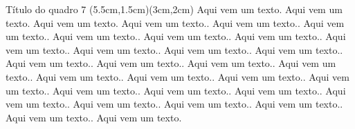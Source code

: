 \documentclass[aspectratio=169]{beamer}
\begin{document}
	\begin{frame}{Título do quadro 7}
		\hypersetup{linkbordercolor=blue}
		(5.5cm,1.5cm)(3cm,2cm)
		Aqui vem um texto. Aqui vem um texto. Aqui vem um texto. Aqui vem um texto.. Aqui vem um texto.. Aqui vem um texto.. Aqui vem um texto.. Aqui vem um texto.. Aqui vem um texto.. Aqui vem um texto.. Aqui vem um texto.. Aqui vem um texto.. Aqui vem um texto.. Aqui vem um texto.. Aqui vem um texto.. Aqui vem um texto.. Aqui vem um texto.. Aqui vem um texto.. Aqui vem um texto.. Aqui vem um texto.. Aqui vem um texto.. Aqui vem um texto.. Aqui vem um texto.. Aqui vem um texto.. Aqui vem um texto.. Aqui vem um texto.. Aqui vem um texto.. Aqui vem um texto.. Aqui vem um texto.. Aqui vem um texto.
	\end{frame}
\end{document}

